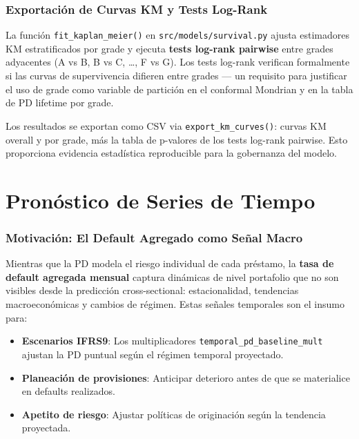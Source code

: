 \documentclass[
  spanish,
  11pt,
  letterpaper,
]{scrbook}
\providecommand{\tightlist}{%
  \setlength{\itemsep}{0pt}\setlength{\parskip}{0pt}}
\theoremstyle{plain}
\theoremstyle{remark}
\begin{document}
\subsection{Exportación de Curvas KM y Tests
Log-Rank}\label{exportaciuxf3n-de-curvas-km-y-tests-log-rank}

La función \texttt{fit\_kaplan\_meier()} en
\texttt{src/models/survival.py} ajusta estimadores KM estratificados por
grade y ejecuta \textbf{tests log-rank pairwise} entre grades adyacentes
(A vs B, B vs C, \ldots, F vs G). Los tests log-rank verifican
formalmente si las curvas de supervivencia difieren entre grades --- un
requisito para justificar el uso de grade como variable de partición en
el conformal Mondrian y en la tabla de PD lifetime por grade.

Los resultados se exportan como CSV via \texttt{export\_km\_curves()}:
curvas KM overall y por grade, más la tabla de p-valores de los tests
log-rank pairwise. Esto proporciona evidencia estadística reproducible
para la gobernanza del modelo.

\chapter{Pronóstico de Series de Tiempo}\label{sec-time-series}

\subsection{Motivación: El Default Agregado como Señal
Macro}\label{motivaciuxf3n-el-default-agregado-como-seuxf1al-macro}

Mientras que la PD modela el riesgo individual de cada préstamo, la
\textbf{tasa de default agregada mensual} captura dinámicas de nivel
portafolio que no son visibles desde la predicción cross-sectional:
estacionalidad, tendencias macroeconómicas y cambios de régimen. Estas
señales temporales son el insumo para:

\begin{itemize}
\tightlist
\item
  \textbf{Escenarios IFRS9}: Los multiplicadores
  \texttt{temporal\_pd\_baseline\_mult} ajustan la PD puntual según el
  régimen temporal proyectado.
\item
  \textbf{Planeación de provisiones}: Anticipar deterioro antes de que
  se materialice en defaults realizados.
\item
  \textbf{Apetito de riesgo}: Ajustar políticas de originación según la
  tendencia proyectada.
\end{itemize}
\end{document}
